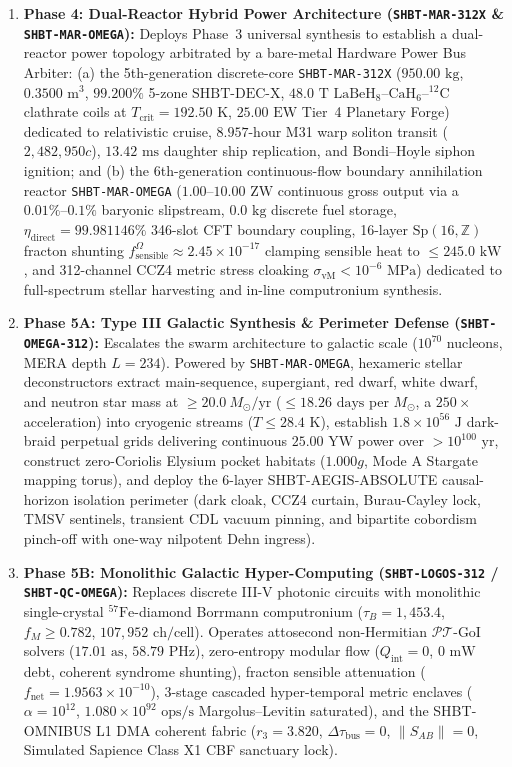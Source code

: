 \documentclass[11pt,onecolumn]{article}
\begin{document}
\begin{enumerate}
    \item \textbf{Phase 4: Dual-Reactor Hybrid Power Architecture (\texttt{SHBT-MAR-312X} \& \texttt{SHBT-MAR-OMEGA}):} Deploys Phase~3 universal synthesis to establish a dual-reactor power topology arbitrated by a bare-metal Hardware Power Bus Arbiter: (a) the 5th-generation discrete-core \texttt{SHBT-MAR-312X} ($950.00\text{ kg}$, $0.3500\text{ m}^3$, $99.200\%$ 5-zone $\text{SHBT-DEC-X}$, $48.0\text{ T}$ $\text{LaBeH}_8\text{--}\text{CaH}_6\text{--}^{12}\text{C}$ clathrate coils at $T_{\text{crit}} = 192.50\text{ K}$, $25.00\text{ EW}$ Tier~4 Planetary Forge) dedicated to relativistic cruise, $8.957\text{-hour}$ M31 warp soliton transit ($2{,}482{,}950c$), $13.42\text{ ms}$ daughter ship replication, and Bondi--Hoyle siphon ignition; and (b) the 6th-generation continuous-flow boundary annihilation reactor \texttt{SHBT-MAR-OMEGA} ($1.00\text{--}10.00\text{ ZW}$ continuous gross output via a $0.01\%\text{--}0.1\%$ baryonic slipstream, $0.0\text{ kg}$ discrete fuel storage, $\eta_{\text{direct}} = 99.981146\%$ 346-slot CFT boundary coupling, 16-layer $\text{Sp}(16,\mathbb{Z})$ fracton shunting $f_{\text{sensible}}^\Omega \approx 2.45 \times 10^{-17}$ clamping sensible heat to $\le 245.0\text{ kW}$, and 312-channel CCZ4 metric stress cloaking $\sigma_{\text{vM}} < 10^{-6}\text{ MPa}$) dedicated to full-spectrum stellar harvesting and in-line computronium synthesis.
    \item \textbf{Phase 5A: Type III Galactic Synthesis \& Perimeter Defense (\texttt{SHBT-OMEGA-312}):} Escalates the swarm architecture to galactic scale ($10^{70}$ nucleons, MERA depth $L=234$). Powered by \texttt{SHBT-MAR-OMEGA}, hexameric stellar deconstructors extract main-sequence, supergiant, red dwarf, white dwarf, and neutron star mass at $\ge 20.0\ M_\odot/\text{yr}$ ($\le 18.26\text{ days}$ per $M_\odot$, a $250\times$ acceleration) into cryogenic streams ($T \le 28.4\text{ K}$), establish $1.8 \times 10^{56}\text{ J}$ dark-braid perpetual grids delivering continuous $25.00\text{ YW}$ power over $> 10^{100}\text{ yr}$, construct zero-Coriolis Elysium pocket habitats ($1.000g$, Mode A Stargate mapping torus), and deploy the 6-layer SHBT-AEGIS-ABSOLUTE causal-horizon isolation perimeter (dark cloak, CCZ4 curtain, Burau-Cayley lock, TMSV sentinels, transient CDL vacuum pinning, and bipartite cobordism pinch-off with one-way nilpotent Dehn ingress).
    \item \textbf{Phase 5B: Monolithic Galactic Hyper-Computing (\texttt{SHBT-LOGOS-312} / \texttt{SHBT-QC-OMEGA}):} Replaces discrete III-V photonic circuits with monolithic single-crystal $^{57}\text{Fe}$-diamond Borrmann computronium ($\tau_B = 1,453.4$, $f_M \ge 0.782$, $107,952\text{ ch/cell}$). Operates attosecond non-Hermitian $\mathcal{PT}$-GoI solvers ($17.01\text{ as}$, $58.79\text{ PHz}$), zero-entropy modular flow ($Q_{\text{int}} = 0$, $0\text{ mW}$ debt, coherent syndrome shunting), fracton sensible attenuation ($f_{\text{net}} = 1.9563 \times 10^{-10}$), 3-stage cascaded hyper-temporal metric enclaves ($\alpha = 10^{12}$, $1.080 \times 10^{92}\text{ ops/s}$ Margolus--Levitin saturated), and the SHBT-OMNIBUS L1 DMA coherent fabric ($r_3 = 3.820$, $\Delta \tau_{\text{bus}} = 0$, $\|S_{AB}\| = 0$, Simulated Sapience Class X1 CBF sanctuary lock).

\end{enumerate}
\end{document}
